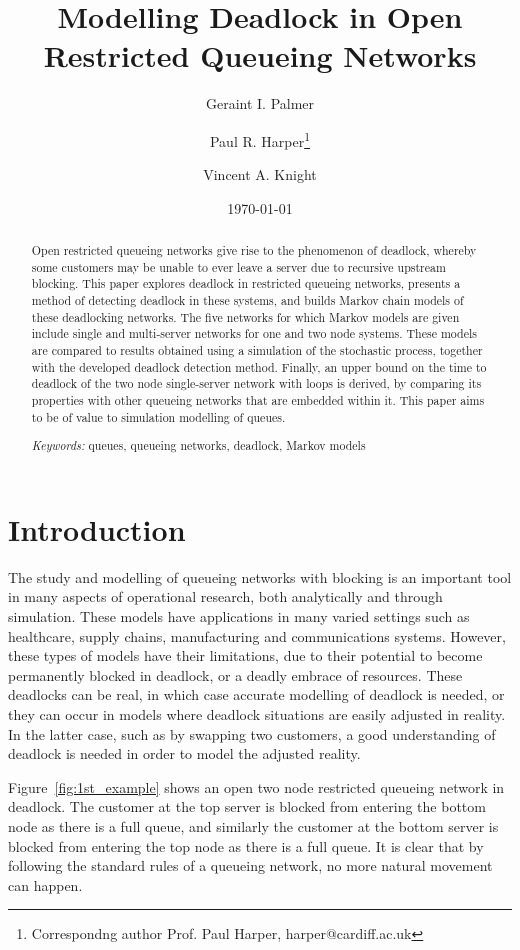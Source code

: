 \documentclass{article}
\title{Modelling Deadlock in Open Restricted Queueing Networks}
\author{Geraint I. Palmer}
\author{Paul R. Harper\thanks{Correspondng author Prof. Paul Harper, harper@cardiff.ac.uk}}
\author{Vincent A. Knight}
\affil{\small{\textit{School of Mathematics, Cardiff University, Senghennydd Road, Cardiff, CF24 4AG}}}
\date{\today}
\numberwithin{equation}{section}
\begin{document}
\onehalfspacing

\maketitle


\begin{abstract}
Open restricted queueing networks give rise to the phenomenon of deadlock, whereby some customers may be unable to ever leave a server due to recursive upstream blocking.
This paper explores deadlock in restricted queueing networks, presents a method of detecting deadlock in these systems, and builds Markov chain models of these deadlocking networks.
The five networks for which Markov models are given include single and multi-server networks for one and two node systems.
These models are compared to results obtained using a simulation of the stochastic process, together with the developed deadlock detection method.
Finally, an upper bound on the time to deadlock of the two node single-server network with loops is derived, by comparing its properties with other queueing networks that are embedded within it.
This paper aims to be of value to simulation modelling of queues.

\textit{Keywords:} queues, queueing networks, deadlock, Markov models
\end{abstract}

\section{Introduction}

The study and modelling of queueing networks with blocking is an important tool in many aspects of operational research, both analytically and through simulation.
These models have applications in many varied settings such as healthcare, supply chains, manufacturing and communications systems.
However, these types of models have their limitations, due to their potential to become permanently blocked in deadlock, or a deadly embrace of resources.
These deadlocks can be real, in which case accurate modelling of deadlock is needed, or they can occur in models where deadlock situations are easily adjusted in reality.
In the latter case, such as by swapping two customers, a good understanding of deadlock is needed in order to model the adjusted reality.

Figure~\ref{fig:1st_example} shows an open two node restricted queueing network in deadlock.
The customer at the top server is blocked from entering the bottom node as there is a full queue, and similarly the customer at the bottom server is blocked from entering the top node as there is a full queue.
It is clear that by following the standard rules of a queueing network, no more natural movement can happen.
\end{document}
